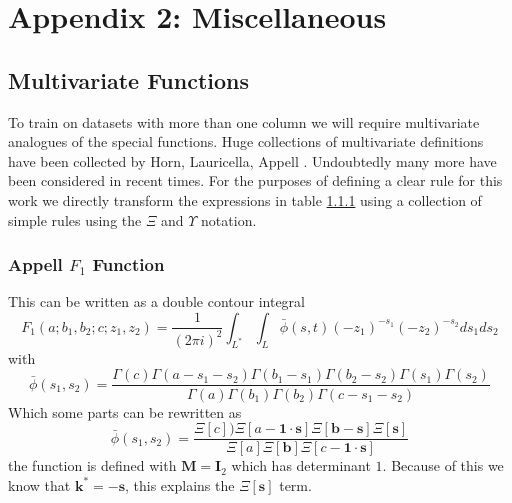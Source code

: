 \documentclass[journal=jcisd8,manuscript=article,layout=onecolumn,pdftex,floatfix,amsmath,amssymb,10pt]{achemso}
\begin{document}
\section{Appendix 2: Miscellaneous}
\subsection{Multivariate Functions}
To train on datasets with more than one column we will require multivariate analogues of the special functions. Huge collections of multivariate definitions have been collected by Horn, Lauricella, Appell \cite{}. Undoubtedly many more have been considered in recent times. For the purposes of defining a clear rule for this work we directly transform the expressions in table \ref{} using a collection of simple rules using the $\Xi$ and $\Upsilon$ notation.

\subsubsection{Appell $F_1$ Function}
This can be written as a double contour integral
\begin{equation}
F_1(a;b_1,b_2;c;z_1,z_2) = \frac{1}{(2\pi i)^2}\int_{L^*} \int_L  \bar{\phi}(s,t) (-z_1)^{-s_1}(-z_2)^{-s_2} ds_1 ds_2
\end{equation}
with \begin{equation}
\bar{\phi}(s_1,s_2) = \frac{\Gamma(c)\Gamma(a-s_1-s_2)\Gamma(b_1-s_1)\Gamma(b_2-s_2)\Gamma(s_1)\Gamma(s_2)}{\Gamma(a)\Gamma(b_1)\Gamma(b_2)\Gamma(c-s_1-s_2)}
\end{equation}
Which some parts can be rewritten as 
\begin{equation}
\bar{\phi}(s_1,s_2) = \frac{\Xi[c])\Xi[a-\mathbf{1}\cdot\mathbf{s}]\Xi[\mathbf{b}-\mathbf{s}]\Xi[\mathbf{s}]}{\Xi[a]\Xi[\mathbf{b}]\Xi[c-\mathbf{1}\cdot\mathbf{s}]}
\end{equation}
the function is defined with $\mathbf{M}=\mathbf{I}_2$ which has determinant $1$. Because of this we know that $\mathbf{k}^* = -\mathbf{s}$, this explains the $\Xi[\mathbf{s}]$ term.
\end{document}
